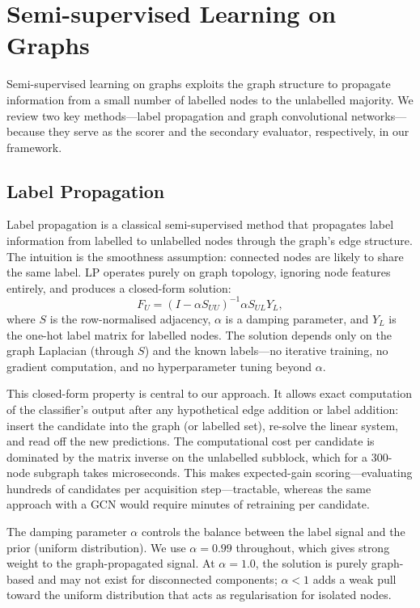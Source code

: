 \documentclass[12pt,a4paper,oneside]{report}
\begin{document}
\section{Semi-supervised Learning on Graphs}

Semi-supervised learning on graphs exploits the graph structure to propagate information from a small number of labelled nodes to the unlabelled majority. We review two key methods---label propagation and graph convolutional networks---because they serve as the scorer and the secondary evaluator, respectively, in our framework.

\subsection{Label Propagation}

Label propagation \citep{zhu} is a classical semi-supervised method that propagates label information from labelled to unlabelled nodes through the graph's edge structure. The intuition is the smoothness assumption: connected nodes are likely to share the same label. LP operates purely on graph topology, ignoring node features entirely, and produces a closed-form solution:
\begin{equation}
    F_U = (I - \alpha S_{UU})^{-1} \alpha S_{UL} Y_L,
\end{equation}
where $S$ is the row-normalised adjacency, $\alpha$ is a damping parameter, and $Y_L$ is the one-hot label matrix for labelled nodes. The solution depends only on the graph Laplacian (through $S$) and the known labels---no iterative training, no gradient computation, and no hyperparameter tuning beyond $\alpha$.

This closed-form property is central to our approach. It allows exact computation of the classifier's output after any hypothetical edge addition or label addition: insert the candidate into the graph (or labelled set), re-solve the linear system, and read off the new predictions. The computational cost per candidate is dominated by the matrix inverse on the unlabelled subblock, which for a 300-node subgraph takes microseconds. This makes expected-gain scoring---evaluating hundreds of candidates per acquisition step---tractable, whereas the same approach with a GCN would require minutes of retraining per candidate.

The damping parameter $\alpha$ controls the balance between the label signal and the prior (uniform distribution). We use $\alpha = 0.99$ throughout, which gives strong weight to the graph-propagated signal. At $\alpha = 1.0$, the solution is purely graph-based and may not exist for disconnected components; $\alpha < 1$ adds a weak pull toward the uniform distribution that acts as regularisation for isolated nodes.
\end{document}
